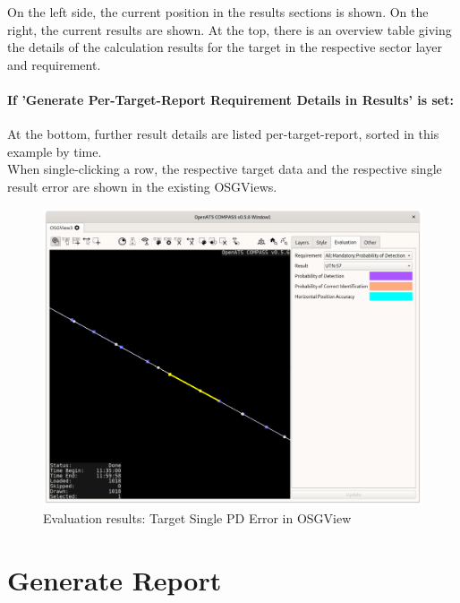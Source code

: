 On the left side, the current position in the results sections is shown. On the right, the current results are shown. At the top, there is an overview table giving the details of the calculation results for the target in the respective sector layer and requirement. \\

\paragraph{If 'Generate Per-Target-Report Requirement Details in Results' is set:}
At the bottom, further result details are listed per-target-report, sorted in this example by time. \\

When single-clicking a row, the respective target data and the respective single result error are shown in the existing OSGViews.

\begin{figure}[H]
  \hspace*{-2.5cm}
    \includegraphics[width=19cm]{../screenshots/eval_results_pd_single_tr_osgview.png}
  \caption{Evaluation results: Target Single PD Error in OSGView}
\end{figure}


\section{Generate Report}
\label{sec:eval_report}


